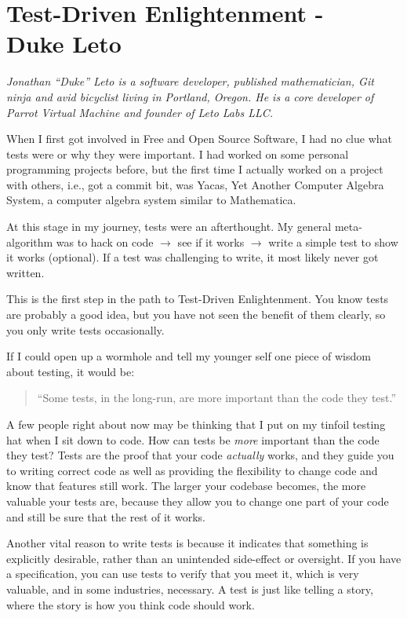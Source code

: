 \chapter{Test-Driven Enlightenment - \\ Duke Leto}

\textit{Jonathan ``Duke'' Leto is a software developer, published mathematician,
Git ninja and avid bicyclist living in Portland, Oregon. He is a core
developer of Parrot Virtual Machine and founder of Leto Labs LLC.}

When I first got involved in Free and Open Source Software, I had no clue what
tests were or why they were important. I had worked on some personal programming
projects before, but the first time I actually worked on a project with others,
i.e., got a commit bit, was Yacas, Yet Another Computer Algebra System, a computer algebra system similar to Mathematica.

At this stage in my journey, tests were an afterthought. My general
meta-algorithm was to hack on code $\rightarrow$ see if it works $\rightarrow$
write a simple test to show it works (optional). If a test was challenging to
write, it most likely never got written.

This is the first step in the path to Test-Driven Enlightenment. You know tests
are probably a good idea, but you have not seen the benefit of them clearly, so
you only write tests occasionally.

If I could open up a wormhole and tell my younger self one piece of wisdom about
testing, it would be:
\begin{quote}``Some tests, in the long-run, are more important than the code
they test.''\end{quote}

A few people right about now may be thinking that I put on my tinfoil testing
hat when I sit down to code. How can tests be \emph{more} important than the
code they test? Tests are the proof that your code \emph{actually} works, and
they guide you to writing correct code as well as providing the flexibility to
change code and know that features still work. The larger your codebase becomes,
the more valuable your tests are, because they allow you to change one part of
your code and still be sure that the rest of it works.

Another vital reason to write tests is because it indicates that something is
explicitly desirable, rather than an unintended side-effect or oversight. If you
have a specification, you can use tests to verify that you meet it, which is
very valuable, and in some industries, necessary. A test is just like telling a
story, where the story is how you think code should work.

